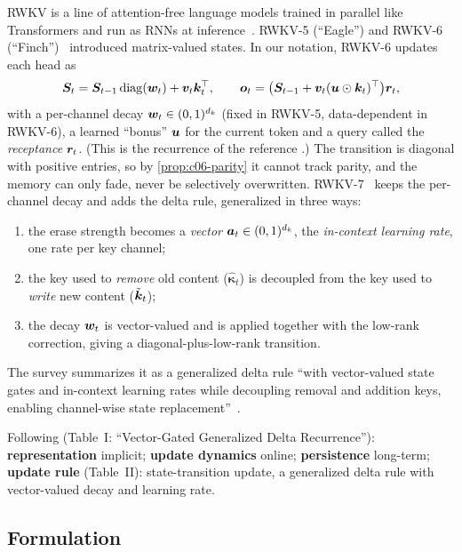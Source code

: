 RWKV is a line of attention-free language models trained in parallel like Transformers and
run as RNNs at inference~\citep{c06-peng2023rwkv}. RWKV-5 (``Eagle'') and RWKV-6
(``Finch'')~\citep{peng2024eagle} introduced matrix-valued states. In our notation, RWKV-6
updates each head as
\begin{equation}\label{eq:c06-rwkv6}
  \bm{S}_t=\bm{S}_{t-1}\operatorname{diag}(\bm{w}_t)+\bm{v}_t\bm{k}_t^{\top},\qquad
  \bm{o}_t=\big(\bm{S}_{t-1}+\bm{v}_t(\bm{u}\odot\bm{k}_t)^{\top}\big)\bm{r}_t ,
\end{equation}
with a per-channel decay $\bm{w}_t\in(0,1)^{d_k}$ (fixed in RWKV-5, data-dependent in RWKV-6), a
learned ``bonus'' $\bm{u}$ for the current token and a query called the \emph{receptance}
$\bm{r}_t$. (This is the recurrence of the \fla{} reference
.) The transition is diagonal with positive entries, so by
\cref{prop:c06-parity} it cannot track parity, and the memory can only fade, never be
selectively overwritten. RWKV-7~\citep{peng2025rwkv7} keeps the per-channel decay and adds
the delta rule, generalized in three ways:
\begin{enumerate}
\item the erase strength becomes a \emph{vector} $\bm{a}_t\in(0,1)^{d_k}$, the
\emph{in-context learning rate}, one rate per key channel;
\item the key used to \emph{remove} old content ($\hat{\bm\kappa}_t$) is decoupled from the
key used to \emph{write} new content ($\tilde{\bm{k}}_t$);
\item the decay $\bm{w}_t$ is vector-valued and is applied together with the low-rank
correction, giving a diagonal-plus-low-rank transition.
\end{enumerate}
The survey summarizes it as a generalized delta rule ``with vector-valued state gates and
in-context learning rates while decoupling removal and addition keys, enabling channel-wise
state replacement''~\citep{zhoubian2026memory}.

\begin{taxonomy}
Following \citet{zhoubian2026memory} (Table~I: ``Vector-Gated Generalized Delta
Recurrence''): \textbf{representation} implicit; \textbf{update dynamics} online;
\textbf{persistence} long-term; \textbf{update rule} (Table~II): state-transition update,
a generalized delta rule with vector-valued decay and learning rate.
\end{taxonomy}

\subsection{Formulation}\label{sec:c06-rwkv-formulation}

